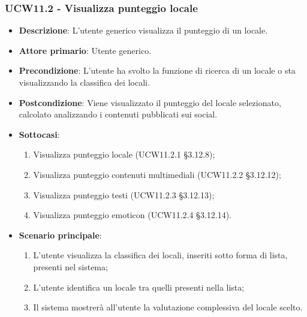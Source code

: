 \subsubsection{UCW11.2 - Visualizza punteggio locale}
\begin{itemize}
    \item \textbf{Descrizione}: L'utente generico visualizza il punteggio di un locale.
    \item \textbf{Attore primario}: Utente generico.
    \item \textbf{Precondizione}: L'utente ha svolto la funzione di ricerca di un locale o sta visualizzando la classifica dei locali.
    \item \textbf{Postcondizione}: Viene visualizzato il punteggio del locale selezionato, calcolato analizzando i contenuti pubblicati sui social.
    \item \textbf{Sottocasi}:
	\begin{enumerate}
		\item Visualizza punteggio locale (UCW11.2.1 \S{}3.12.8);
		\item Visualizza punteggio contenuti multimediali (UCW11.2.2 \S{}3.12.12);
		\item Visualizza punteggio testi (UCW11.2.3 \S{}3.12.13);
		\item Visualizza punteggio emoticon (UCW11.2.4 \S{}3.12.14).
	\end{enumerate}
    \item \textbf{Scenario principale}: 
    \begin{enumerate}
	\item L'utente visualizza la classifica dei locali, inseriti sotto forma di lista, presenti nel sistema;    
    \item L'utente identifica un locale tra quelli presenti nella lista;
    \item Il sistema mostrerà all'utente la valutazione complessiva del locale scelto.
    \end{enumerate}
\end{itemize}

